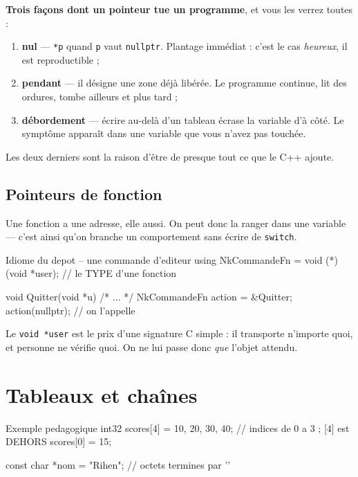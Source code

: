 \begin{nkpiege}
\textbf{Trois façons dont un pointeur tue un programme}, et vous les verrez
toutes :

\begin{enumerate}
\item \textbf{nul} --- \texttt{*p} quand \texttt{p} vaut \texttt{nullptr}.
      Plantage immédiat : c'est le cas \emph{heureux}, il est reproductible ;
\item \textbf{pendant} --- il désigne une zone déjà libérée. Le programme
      continue, lit des ordures, tombe ailleurs et plus tard ;
\item \textbf{débordement} --- écrire au-delà d'un tableau écrase la variable
      d'à côté. Le symptôme apparaît dans une variable que vous n'avez pas
      touchée.
\end{enumerate}

Les deux derniers sont la raison d'être de presque tout ce que le C++ ajoute.
\end{nkpiege}

\subsection{Pointeurs de fonction}

Une fonction a une adresse, elle aussi. On peut donc la ranger dans une variable
--- c'est ainsi qu'on branche un comportement sans écrire de \texttt{switch}.

\begin{nkcode}{Idiome du depot -- une commande d'editeur}
using NkCommandeFn = void (*)(void *user);   // le TYPE d'une fonction

void Quitter(void *u) { /* ... */ }
NkCommandeFn action = &Quitter;
action(nullptr);                              // on l'appelle
\end{nkcode}

Le \texttt{void *user} est le prix d'une signature C simple : il transporte
n'importe quoi, et personne ne vérifie quoi. On ne lui passe donc \emph{que}
l'objet attendu.

\section{Tableaux et chaînes}

\begin{nkcode}{Exemple pedagogique}
int32 scores[4] = {10, 20, 30, 40};   // indices de 0 a 3 ; [4] est DEHORS
scores[0] = 15;

const char *nom = "Rihen";            // octets termines par '\0'
\end{nkcode}

